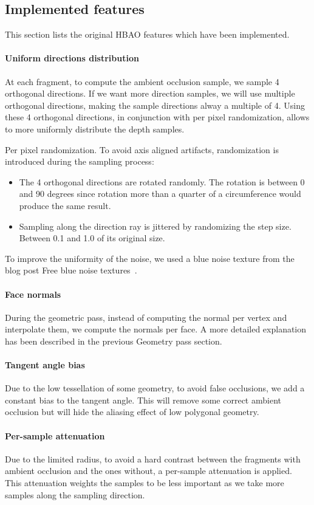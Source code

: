 \documentclass{article}
\begin{document}
\subsection*{Implemented features}
This section lists the original HBAO features which have been implemented.

\paragraph*{Uniform directions distribution} At each fragment, to compute the ambient occlusion sample, we sample 4 orthogonal directions. If we want more direction samples, we will use multiple orthogonal directions, making the sample directions alway a multiple of 4. Using these 4 orthogonal directions, in conjunction with per pixel randomization, allows to more uniformly distribute the depth samples.
 
Per pixel randomization. To avoid axis aligned artifacts, randomization is introduced during the sampling process:
\begin{itemize}
\item The 4 orthogonal directions are rotated randomly. The rotation is between 0 and 90 degrees since rotation more than a quarter of a circumference would produce the same result.
\item Sampling along the direction ray is jittered by randomizing the step size. Between 0.1 and 1.0 of its original size.
\end{itemize}
To improve the uniformity of the noise, we used a blue noise texture from the blog post Free blue noise textures~\cite{noise}.

\paragraph*{Face normals} During the geometric pass, instead of computing the normal per vertex and interpolate them, we compute the normals per face. A more detailed explanation has been described in the previous Geometry pass section.

\paragraph*{Tangent angle bias} Due to the low tessellation of some geometry, to avoid false occlusions, we add a constant bias to the tangent angle. This will remove some correct ambient occlusion but will hide the aliasing effect of low polygonal geometry.

\paragraph*{Per-sample attenuation} Due to the limited radius, to avoid a hard contrast between the fragments with ambient occlusion and the ones without, a per-sample attenuation is applied. This attenuation weights the samples to be less important as we take more samples along the sampling direction. 
\end{document}
